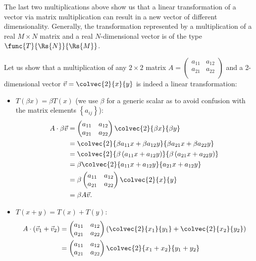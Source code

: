 The last two multiplications above show us that a linear transformation of a vector via matrix multiplication can result in a new vector of different dimensionality. Generally, the transformation represented by a multiplication of a real $M\times N$ matrix and a real $N$-dimensional vector is of the type $\func{T}{\Rs{N}}{\Rs{M}}$.

Let us show that a multiplication of any $2\times2$ matrix $A=\begin{pmatrix} a_{11} & a_{12}\\a_{21} & a_{22}\\\end{pmatrix}$ and a 2-dimensional vector $\vec{v}=\colvec{2}{x}{y}$ is indeed a linear transformation:
\begin{itemize}
  \item $T(\beta x) = \beta T(x)$ (we use $\beta$ for a generic scalar as to avoid confusion with the matrix elements $\left\{ a_{ij} \right\}$):
	\begin{align*}
	  A\cdot\beta\vec{v} &= \begin{pmatrix} a_{11} & a_{12}\\a_{21} & a_{22}\\\end{pmatrix}\colvec{2}{\beta x}{\beta y}\\
	  &= \colvec{2}{\beta a_{11}x+\beta a_{12}y}{\beta a_{21}x+\beta a_{22}y}\\
	  &= \colvec{2}{\beta\left( a_{11}x+a_{12}y \right)}{\beta\left( a_{21}x + a_{22}y \right)}\\
	  &= \beta\colvec{2}{a_{11}x+a_{12}y}{a_{21}x+a_{12}y}\\
	  &= \beta \begin{pmatrix} a_{11} & a_{12}\\a_{21} & a_{22}\\\end{pmatrix}\colvec{2}{x}{y}\\
	  &= \beta A\vec{v}.
	\end{align*}
  \item $T(x+y)=T(x)+T(y)$:
	\begin{align*}
	  A\cdot\left( \vec{v}_{1}+\vec{v}_{2} \right) &= \begin{pmatrix} a_{11} & a_{12}\\a_{21} & a_{22}\\\end{pmatrix}\left( \colvec{2}{x_{1}}{y_{1}}+\colvec{2}{x_{2}}{y_{2}} \right)\\
	  &= \begin{pmatrix} a_{11} & a_{12}\\a_{21} & a_{22}\\\end{pmatrix}\colvec{2}{x_{1}+x_{2}}{y_{1}+y_{2}}\\

\end{align*}
\end{itemize}
